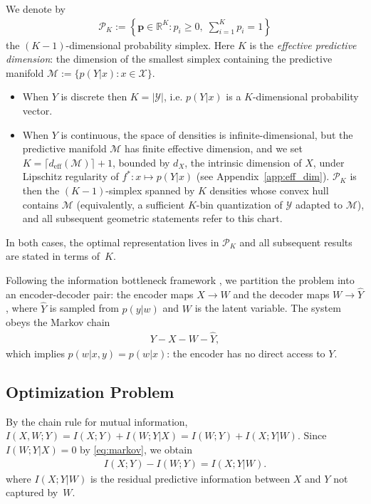 \documentclass[11pt]{article}
\begin{document}
We denote by
\begin{align}
    \mathcal{P}_K := \left\{ \mathbf{p} \in \mathbb{R}^K : p_i \geq 0,\;
    \sum_{i=1}^K p_i = 1 \right\}
    \label{eq:simplex}
\end{align}
the $(K{-}1)$-dimensional probability simplex.
Here $K$ is the \textit{effective predictive dimension}: the dimension
of the smallest simplex containing the predictive manifold
$\mathcal{M}:=\{p(Y|x):x\in\mathcal{X}\}$.
\begin{itemize}
    \item When $Y$ is discrete then
    $K=|\mathcal{Y}|$, i.e. $p(Y|x)$ is a $K$-dimensional
    probability vector.
    \item When $Y$ is continuous, the space of densities is
    infinite-dimensional, but the predictive manifold $\mathcal{M}$
    has finite effective dimension, and we set
    $K=\lceil d_{\mathrm{eff}}(\mathcal{M}) \rceil + 1$,
    bounded by $d_X$, the intrinsic dimension of $X$, under Lipschitz
    regularity of $f^*\colon x\mapsto p(Y|x)$ (see Appendix~\ref{app:eff_dim}).
    $\mathcal{P}_K$ is then the $(K{-}1)$-simplex spanned by $K$
    densities whose convex hull contains $\mathcal{M}$
    (equivalently, a sufficient $K$-bin quantization of $\mathcal{Y}$
    adapted to $\mathcal{M}$), and all subsequent geometric
    statements refer to this chart.
\end{itemize}
In both cases, the optimal representation lives in $\mathcal{P}_K$
and all subsequent results are stated in terms of~$K$.

Following the information bottleneck framework
\cite{tishby1999information}, we partition the problem into an
encoder-decoder pair: the encoder maps $X\rightarrow W$ and the decoder
maps $W\rightarrow \hat{Y}$, where $\hat{Y}$ is sampled from $p(y|w)$
and $W$ is the latent variable.
The system obeys the Markov chain
\begin{align}
    Y - X - W - \hat{Y},
    \label{eq:markov}
\end{align}
which implies $p(w|x,y)=p(w|x)$: the encoder has no direct access
to $Y$.

\subsection{Optimization Problem}

By the chain rule for mutual information,
$I(X,W;Y)=I(X;Y)+I(W;Y|X)=I(W;Y)+I(X;Y|W)$.
Since $I(W;Y|X)=0$ by \eqref{eq:markov}, we obtain
\begin{align}
    I(X;Y) - I(W;Y) = I(X;Y|W).
    \label{eq:identity}
\end{align}
where $I(X;Y|W)$ is the residual predictive information between
$X$ and $Y$ not captured by~$W$.
\end{document}
